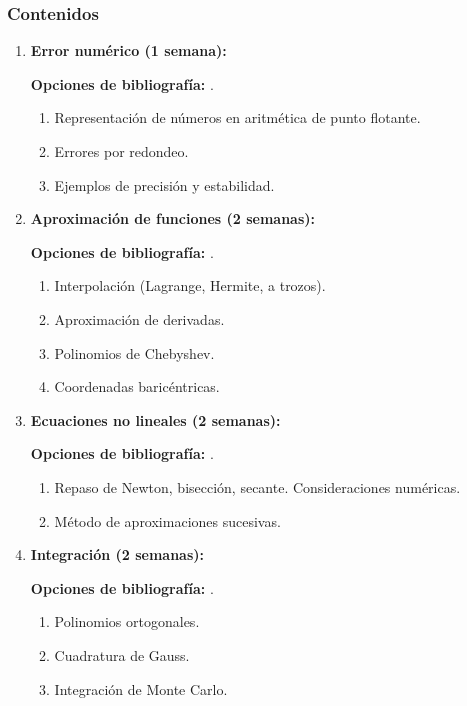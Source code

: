 \begin{refsection}
\subsubsection*{Contenidos}
\begin{enumerate}
\item \textbf{Error numérico (1 semana):}

\textbf{Opciones de bibliografía:} \cite{Overton}.

\begin{enumerate}
	\item Representación de números en aritmética de punto flotante.
	\item Errores por redondeo.
	\item Ejemplos de precisión y estabilidad.
\end{enumerate}

\item \textbf{Aproximación de funciones (2 semanas):}

\textbf{Opciones de bibliografía:} \cite{Suli2003,Trefethen2}.

\begin{enumerate}
	\item Interpolación (Lagrange, Hermite, a trozos). 
	\item Aproximación de derivadas.
	\item Polinomios de Chebyshev.
	\item Coordenadas baricéntricas.
\end{enumerate}
	
	
\item \textbf{Ecuaciones no lineales (2 semanas):}

\textbf{Opciones de bibliografía:} \cite{Suli2003}.
	
\begin{enumerate}
    \item Repaso de Newton, bisección, secante. Consideraciones numéricas.
	\item Método de aproximaciones sucesivas.
\end{enumerate}

\item \textbf{Integración (2 semanas):}

\textbf{Opciones de bibliografía:} \cite{Suli2003}.

\begin{enumerate}
	\item Polinomios ortogonales.
	\item Cuadratura de Gauss.
	\item Integración de Monte Carlo.
\end{enumerate}
	

\end{enumerate}
\end{refsection}
